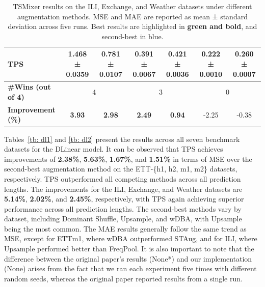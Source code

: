 \begin{table}[h!]
\begin{adjustbox}{max width=\textwidth}
\begin{tabular}{l|cc|cc|cc}
    TPS          & \cellcolor{bestcolor}\textbf{1.468 ± 0.0359} & \cellcolor{bestcolor}\textbf{0.781 ± 0.0107} & \cellcolor{bestcolor}\textbf{0.391 ± 0.0067} & \cellcolor{bestcolor}\textbf{0.421 ± 0.0036} & \cellcolor{secondcolor}0.222 ± 0.0010 & \cellcolor{secondcolor}0.260 ± 0.0007 \\
    \midrule
    \textbf{\#Wins (out of 4)} & \multicolumn{2}{c|}{4} & \multicolumn{2}{c|}{3} & \multicolumn{2}{c}{0} \\
    \textbf{Improvement (\%)} & \cellcolor{bestcolor} \textbf{3.93} & \cellcolor{bestcolor} \textbf{2.98} & \cellcolor{bestcolor} \textbf{2.49} & \cellcolor{bestcolor} \textbf{0.94} & \cellcolor{worstcolor}-2.25 & \cellcolor{worstcolor}-0.38 \\
    \bottomrule
\end{tabular}
\end{adjustbox}
\caption{TSMixer results on the ILI, Exchange, and Weather datasets under different augmentation methods. MSE and MAE are reported as mean ± standard deviation across five runs. Best results are highlighted in \textbf{green and bold}, and second-best in blue.}
\label{tb: ts2}
\end{table}






Tables~\ref{tb: dl1} and \ref{tb: dl2} present the results across all seven benchmark datasets for the DLinear model. It can be observed that TPS achieves improvements of \textbf{2.38\%}, \textbf{5.63\%}, \textbf{1.67\%}, and \textbf{1.51\%} in terms of MSE over the second-best augmentation method on the ETT-\{h1, h2, m1, m2\} datasets, respectively. TPS outperformed all competing methods across all prediction lengths. The improvements for the ILI, Exchange, and Weather datasets are \textbf{5.14\%}, \textbf{2.02\%}, and \textbf{2.45\%}, respectively, with TPS again achieving superior performance across all prediction lengths. The second-best methods vary by dataset, including Dominant Shuffle, Upsample, and wDBA, with Upsample being the most common. The MAE results generally follow the same trend as MSE, except for ETTm1, where wDBA outperformed STAug, and for ILI, where Upsample performed better than FreqPool. It is also important to note that the difference between the original paper’s results (None*) and our implementation (None) arises from the fact that we ran each experiment five times with different random seeds, whereas the original paper reported results from a single run.




